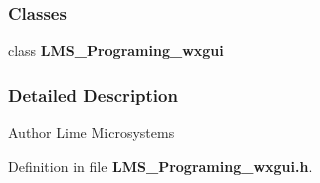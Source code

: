 \subsubsection*{Classes}
\begin{DoxyCompactItemize}
\item 
class {\bf L\+M\+S\+\_\+\+Programing\+\_\+wxgui}
\end{DoxyCompactItemize}


\subsubsection{Detailed Description}
\begin{DoxyAuthor}{Author}
Lime Microsystems 
\end{DoxyAuthor}


Definition in file {\bf L\+M\+S\+\_\+\+Programing\+\_\+wxgui.\+h}.

